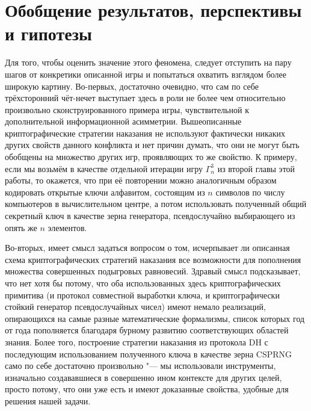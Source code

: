 \section{Обобщение результатов, перспективы и гипотезы}\label{sec:ch3/sect6}

Для того, чтобы оценить значение этого феномена, следует отступить на пару шагов от конкретики описанной игры и попытаться охватить взглядом более широкую картину. Во-первых, достаточно очевидно, что сам по себе трёхсторонний чёт-нечет выступает здесь в роли не более чем относительно произвольно сконструированного примера игры, чувствительной к дополнительной информационной асимметрии. Вышеописанные криптографические стратегии наказания не используют фактически никаких других свойств данного конфликта и нет причин думать, что они не могут быть обобщены на множество других игр, проявляющих то же свойство. К примеру, если мы возьмём в качестве отдельной итерации игру $\Gamma^3_n$ из второй главы этой работы, то окажется, что при её повторении можно аналогичным образом кодировать открытые ключи алфавитом, состоящим из $n$ символов по числу компьютеров в вычислительном центре, а потом использовать полученный общий секретный ключ в качестве зерна генератора, псевдослучайно выбирающего из опять же $n$ элементов.

Во-вторых, имеет смысл задаться вопросом о том, исчерпывает ли описанная схема криптографических стратегий наказания все возможности для пополнения множества совершенных подыгровых равновесий. Здравый смысл подсказывает, что нет хотя бы потому, что оба использованных здесь криптографических примитива (и протокол совместной выработки ключа, и криптографически стойкий генератор псевдослучайных чисел) имеют немало реализаций, опирающихся на самые разные математические формализмы, список которых год от года пополняется благодаря бурному развитию соответствующих областей знания. Более того, построение стратегии наказания из протокола DH с последующим использованием полученного ключа в качестве зерна CSPRNG само по себе достаточно произвольно "--- мы использовали инструменты, изначально создававшиеся в совершенно ином контексте для других целей, просто потому, что они уже есть и имеют доказанные свойства, удобные для решения нашей задачи.

